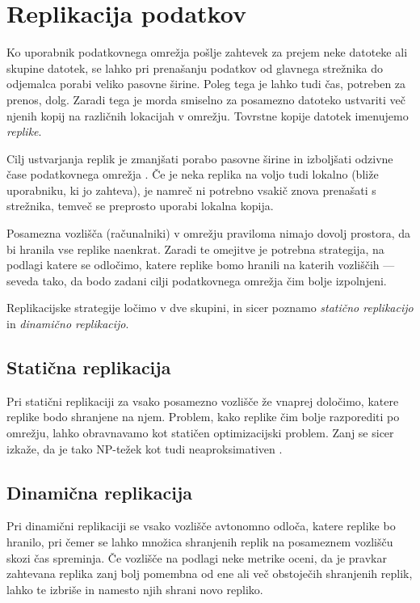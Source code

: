 \documentclass[a4paper, 12pt]{book}
\newcommand{\newterm}{\textit}
\begin{document}
\section{Replikacija podatkov}

Ko uporabnik podatkovnega omrežja pošlje zahtevek za prejem neke datoteke
ali skupine datotek, se lahko pri prenašanju podatkov od glavnega strežnika
do odjemalca porabi veliko pasovne širine. Poleg tega je lahko tudi čas,
potreben za prenos, dolg. Zaradi tega je morda smiselno za posamezno
datoteko ustvariti več njenih kopij na različnih lokacijah v omrežju.
Tovrstne kopije datotek imenujemo \newterm{replike}.

Cilj ustvarjanja replik je zmanjšati porabo pasovne širine in izboljšati
odzivne čase podatkovnega omrežja \cite{dgrid_goals_perf}. Če je neka replika na
voljo tudi lokalno (bliže uporabniku, ki jo zahteva), je namreč ni potrebno
vsakič znova prenašati s strežnika, temveč se preprosto uporabi lokalna kopija.

Posamezna vozlišča (računalniki) v omrežju praviloma nimajo dovolj prostora,
da bi hranila vse replike naenkrat. Zaradi te omejitve je potrebna
strategija, na podlagi katere se odločimo, katere replike bomo hranili
na katerih vozliščih --- seveda tako, da bodo zadani cilji podatkovnega
omrežja čim bolje izpolnjeni.

Replikacijske strategije ločimo v dve skupini, in sicer poznamo
\newterm{statično replikacijo} in \newterm{dinamično replikacijo}.

\subsection{Statična replikacija}

Pri statični replikaciji za vsako posamezno vozlišče že vnaprej določimo,
katere replike bodo shranjene na njem. Problem, kako replike čim bolje
razporediti po omrežju, lahko obravnavamo kot statičen optimizacijski
problem. Zanj se sicer izkaže, da je tako NP-težek kot tudi
neaproksimativen \cite{cibej2005}.

\subsection{Dinamična replikacija}

Pri dinamični replikaciji se vsako vozlišče avtonomno odloča, katere
replike bo hranilo, pri čemer se lahko množica shranjenih replik na
posameznem vozlišču skozi čas spreminja. Če vozlišče na podlagi neke
metrike oceni, da je pravkar zahtevana replika zanj bolj pomembna od ene
ali več obstoječih shranjenih replik, lahko te izbriše in namesto
njih shrani novo repliko.
\end{document}
